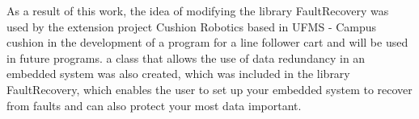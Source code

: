 As a result of this work, the idea of modifying the library FaultRecovery was used by the extension project Cushion Robotics based in UFMS - Campus cushion in the development of a program for a line follower cart and will be used in future programs. a class that allows the use of data redundancy in an embedded system was also created, which was included in the library FaultRecovery, which enables the user to set up your embedded system to recover from faults and can also protect your most data important.

\thispagestyle{empty}
